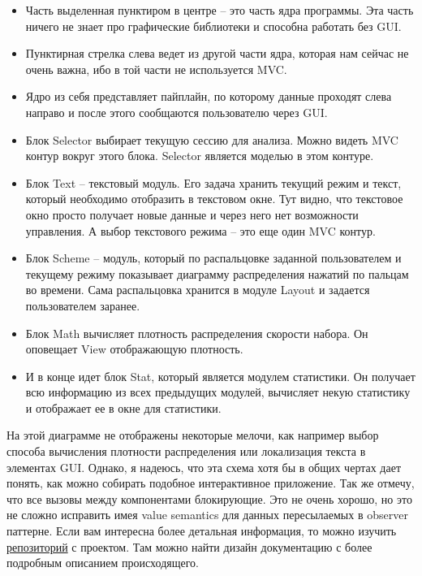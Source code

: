 \begin{itemize}
\item Часть выделенная пунктиром в центре -- это часть ядра программы.
Эта часть ничего не знает про графические библиотеки и способна работать без GUI.

\item Пунктирная стрелка слева ведет из другой части ядра, которая нам сейчас не очень важна, ибо в той части не используется MVC.

\item Ядро из себя представляет пайплайн, по которому данные проходят слева направо и после этого сообщаются пользователю через GUI.

\item Блок Selector выбирает текущую сессию для анализа.
Можно видеть MVC контур вокруг этого блока.
Selector является моделью в этом контуре.

\item Блок Text -- текстовый модуль.
Его задача хранить текущий режим и текст, который необходимо отобразить в текстовом окне.
Тут видно, что текстовое окно просто получает новые данные и через него нет возможности управления.
А выбор текстового режима -- это еще один MVC контур.

\item Блок Scheme -- модуль, который по распальцовке заданной пользователем и текущему режиму показывает диаграмму распределения нажатий по пальцам во времени.
Сама распальцовка хранится в модуле Layout и задается пользователем заранее.

\item Блок Math вычисляет плотность распределения скорости набора.
Он оповещает View отображающую плотность.

\item И в конце идет блок Stat, который является модулем статистики.
Он получает всю информацию из всех предыдущих модулей, вычисляет некую статистику и отображает ее в окне для статистики.
\end{itemize}
На этой диаграмме не отображены некоторые мелочи, как например выбор способа вычисления плотности распределения или локализация текста в элементах GUI.
Однако, я надеюсь, что эта схема хотя бы в общих чертах дает понять, как можно собирать подобное интерактивное приложение.
Так же отмечу, что все вызовы между компонентами блокирующие.
Это не очень хорошо, но это не сложно исправить имея value semantics для данных пересылаемых в observer паттерне.
Если вам интересна более детальная информация, то можно изучить \href{https://github.com/DimaTrushin/TypingAnalysis}{репозиторий} с проектом.
Там можно найти дизайн документацию с более подробным описанием происходящего.

